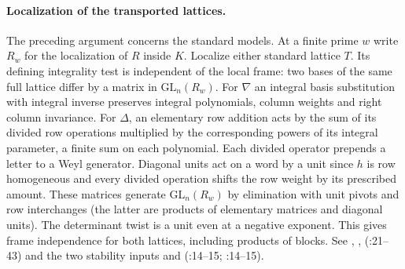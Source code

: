 \paragraph{Localization of the transported lattices.}
The preceding argument concerns the standard models. At a finite
prime $w$ write $R_w$ for the localization of $R$ inside $K$.
Localize either standard lattice $T$. Its defining integrality test is
independent of the local frame: two bases of the same full lattice
differ by a matrix in $\mathrm{GL}_n(R_w)$.
For $\nabla$ an integral basis substitution with integral inverse
preserves integral polynomials, column weights and right column
invariance. For $\Delta$, an elementary row addition acts by the sum
of its divided row operations multiplied by the corresponding powers
of its integral parameter, a finite sum on each polynomial. Each
divided operator prepends a letter to a Weyl generator. Diagonal units
act on a word by a unit since $h$ is row homogeneous and every divided
operation shifts the row weight by its prescribed amount. These
matrices generate $\mathrm{GL}_n(R_w)$ by elimination with unit
pivots and row interchanges (the latter are products of elementary
matrices and diagonal units). The determinant twist is a unit even
at a negative exponent. This gives frame independence for both
lattices, including products of blocks.
See , ,
(:21--43) and the two
stability inputs 
and 
(:14--15;
:14--15).

